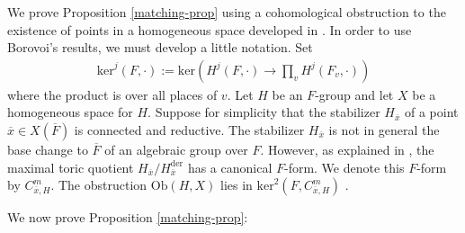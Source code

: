 \documentclass[12pt]{amsart}
\theoremstyle{remark}
\numberwithin{equation}{section}
\theoremstyle{definition}
\renewcommand{\bar}{\overline}
\numberwithin{equation}{subsection}
\begin{document}
We prove Proposition \ref{matching-prop} using a
cohomological obstruction to the existence of points in a homogeneous space developed in \cite{BorHasse}.
In order to use Borovoi's results, we must develop a little notation.
Set
\begin{align} \label{ker}
\mathrm{ker}^j(F, \cdot):=\mathrm{ker}(H^j(F,\cdot) \to \prod_vH^j(F_v,\cdot))
\end{align}
where the product is over all places of $v$.
Let $H$ be an $F$-group and let $X$ be a
homogeneous space for $H$.  Suppose for simplicity that the
stabilizer $H_{\bar{x}}$ of a point $\bar{x} \in X(\bar{F})$ is connected and reductive.
The stabilizer $H_{\bar{x}}$ is not in general the base change to $\bar{F}$ of an algebraic
group over $F$.  However, as explained in \cite[\S 1.7]{BorHasse}, the maximal toric quotient
$H_{\bar{x}}/H_{\bar{x}}^{\mathrm{der}}$ has a canonical $F$-form.   We denote this $F$-form by $C^m_{\bar{x},H}$.\index{$C^m_{\bar{x},H}$}
The obstruction $\mathrm{Ob}(H,X)$ lies in $\mathrm{ker}^2(F,C^m_{\bar{x},H})$ \cite[\S 1.5]{BorHasse}.

We now prove Proposition \ref{matching-prop}:
\end{document}
